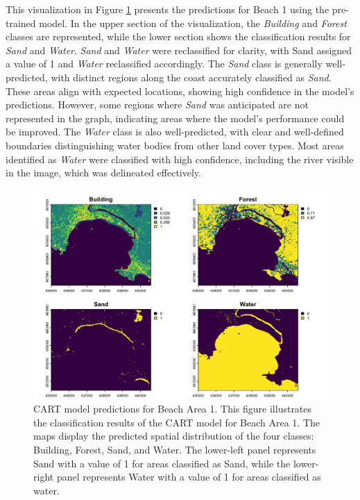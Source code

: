 \documentclass[a4paper,12pt]{article}
\begin{document}
This visualization in Figure \ref{fig:Cart Beach1} presents the predictions for Beach 1 using the pre-trained model.
In the upper section of the visualization, the \textit{Building} and \textit{Forest} classes are represented, while the lower section shows the classification results for \textit{Sand} and \textit{Water}. \textit{Sand} and \textit{Water} were reclassified for clarity, with Sand assigned a value of 1 and \textit{Water} reclassified accordingly.
The \textit{Sand} class is generally well-predicted, with distinct regions along the coast accurately classified as \textit{Sand}. These areas align with expected locations, showing high confidence in the model's predictions. However, some regions where \textit{Sand} was anticipated are not represented in the graph, indicating areas where the model's performance could be improved.
The \textit{Water} class is also well-predicted, with clear and well-defined boundaries distinguishing water bodies from other land cover types. Most areas identified as \textit{Water} were classified with high confidence, including the river visible in the image, which was delineated effectively.
\begin{figure}[H]
    \centering
    \includegraphics[width=0.5\linewidth]{CART_Model/CART on Beach1: Predictions.png}
    \caption[CART model predictions for Beach Area 1]{CART model predictions for Beach Area 1. This figure illustrates the classification results of the CART model for Beach Area 1. The maps display the predicted spatial distribution of the four classes: Building, Forest, Sand, and Water. The lower-left panel represents Sand with a value of 1 for areas classified as Sand, while the lower-right panel represents Water with a value of 1 for areas classified as water.}
    \label{fig:Cart Beach1}
\end{figure}
\end{document}
